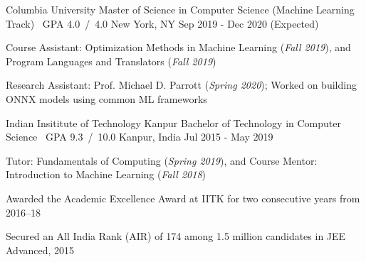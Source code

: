 

\cventry
	{Columbia University}
	{Master of Science in Computer Science (Machine Learning Track) \acvSectionTitleSep \ GPA 4.0{\tiny\ }/{\tiny\ }4.0}
	{New York, NY}
	{Sep 2019 - Dec 2020 (Expected)}
	{%
		\begin{cvitems}
            \item Course Assistant: Optimization Methods in Machine Learning
                (\textit{Fall 2019}), and Program Languages and Translators
                (\textit{Fall 2019})
            \item Research Assistant: Prof. Michael D. Parrott (\textit{Spring 2020}); Worked on building ONNX models using common ML frameworks 
		\end{cvitems}
	}

\cventry
	{Indian Insititute of Technology Kanpur}
	{Bachelor of Technology in Computer Science \acvSectionTitleSep \ GPA 9.3{\tiny\ }/{\tiny\ }10.0}
	{Kanpur, India}
	{Jul 2015 - May 2019}
	{%
		\begin{cvitems}
			\item Tutor: Fundamentals of Computing (\textit{Spring 2019}), and Course Mentor: Introduction to Machine Learning (\textit{Fall 2018})
			\item Awarded the Academic Excellence Award at IITK for two consecutive years from 2016--18
			\item Secured an All India Rank (AIR) of 174 among 1.5 million candidates in JEE Advanced, 2015
		\end{cvitems}
	}

